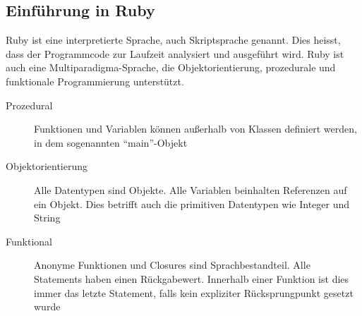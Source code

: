\subsection{Einführung in Ruby}
Ruby ist eine interpretierte Sprache, auch Skriptsprache genannt. Dies heisst, dass der Programmcode zur Laufzeit analysiert und ausgeführt wird. Ruby ist auch eine Multiparadigma-Sprache, die Objektorientierung, prozedurale und funktionale Programmierung unterstützt.
\begin{description}
 \item[Prozedural] Funktionen und Variablen können außerhalb von Klassen definiert werden, in dem sogenannten "`main"'-Objekt
 \item[Objektorientierung] Alle Datentypen sind Objekte. Alle Variablen beinhalten Referenzen auf ein Objekt. Dies betrifft auch die primitiven Datentypen wie Integer und String
 \item[Funktional] Anonyme Funktionen und Closures sind Sprachbestandteil. Alle Statements haben einen Rückgabewert. Innerhalb einer Funktion ist dies immer das letzte Statement, falls kein expliziter Rücksprungpunkt gesetzt wurde
\end{description}


